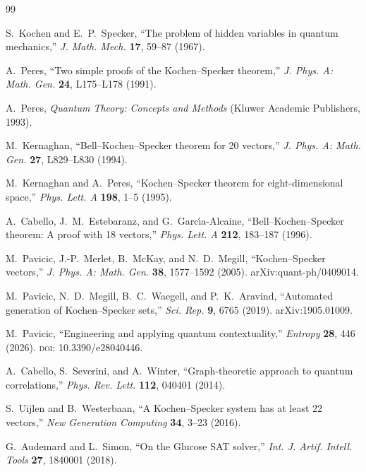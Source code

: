 \documentclass[12pt,a4paper]{article}
\begin{document}
\begin{thebibliography}{99}

S.~Kochen and E.~P.~Specker,
``The problem of hidden variables in quantum mechanics,''
\textit{J. Math. Mech.} \textbf{17}, 59--87 (1967).

A.~Peres,
``Two simple proofs of the Kochen--Specker theorem,''
\textit{J. Phys. A: Math. Gen.} \textbf{24}, L175--L178 (1991).

A.~Peres,
\textit{Quantum Theory: Concepts and Methods}
(Kluwer Academic Publishers, 1993).

M.~Kernaghan,
``Bell--Kochen--Specker theorem for 20 vectors,''
\textit{J. Phys. A: Math. Gen.} \textbf{27}, L829--L830 (1994).

M.~Kernaghan and A.~Peres,
``Kochen--Specker theorem for eight-dimensional space,''
\textit{Phys. Lett. A} \textbf{198}, 1--5 (1995).

A.~Cabello, J.~M.~Estebaranz, and G.~Garc\'{\i}a-Alcaine,
``Bell--Kochen--Specker theorem: A proof with 18 vectors,''
\textit{Phys. Lett. A} \textbf{212}, 183--187 (1996).

M.~Pavicic, J.-P.~Merlet, B.~McKay, and N.~D.~Megill,
``Kochen--Specker vectors,''
\textit{J. Phys. A: Math. Gen.} \textbf{38}, 1577--1592 (2005).
arXiv:quant-ph/0409014.

M.~Pavicic, N.~D.~Megill, B.~C.~Waegell, and P.~K.~Aravind,
``Automated generation of Kochen--Specker sets,''
\textit{Sci. Rep.} \textbf{9}, 6765 (2019).
arXiv:1905.01009.

M.~Pavicic,
``Engineering and applying quantum contextuality,''
\textit{Entropy} \textbf{28}, 446 (2026).
\textsc{doi}: 10.3390/e28040446.

A.~Cabello, S.~Severini, and A.~Winter,
``Graph-theoretic approach to quantum correlations,''
\textit{Phys. Rev. Lett.} \textbf{112}, 040401 (2014).

S.~Uijlen and B.~Westerbaan,
``A Kochen--Specker system has at least 22 vectors,''
\textit{New Generation Computing} \textbf{34}, 3--23 (2016).

G.~Audemard and L.~Simon,
``On the Glucose SAT solver,''
\textit{Int. J. Artif. Intell. Tools} \textbf{27}, 1840001 (2018).


\end{thebibliography}
\end{document}

